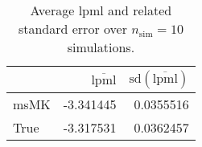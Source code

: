 \begin{table}[H]

\caption{Average lpml and related standard error over $n_{\text{sim}} = 10$ simulations.}
\centering
\begin{tabular}[t]{lrr}
\toprule
  & $\overbar{\text{lpml}}$ & $\text{sd}(\overbar{\text{lpml}})$\\
\midrule
msMK & -3.341445 & 0.0355516\\
True & -3.317531 & 0.0362457\\
\bottomrule
\end{tabular}
\end{table}
